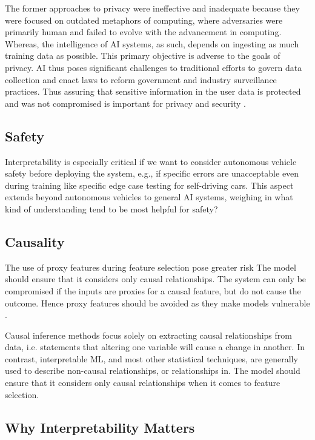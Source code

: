 The former approaches to privacy were ineffective and inadequate because they were focused on outdated metaphors of computing, where adversaries were primarily human and failed to evolve with the advancement in computing. Whereas, the intelligence of AI systems, as such, depends on ingesting as much training data as possible. This primary objective is adverse to the goals of privacy. AI thus poses significant challenges to traditional efforts to govern data collection and enact laws to reform government and industry surveillance practices. Thus assuring that sensitive information in the user data is protected and was not compromised is important for privacy and security \cite{molnar}. 

\subsection{Safety}

Interpretability is especially critical if we want to consider autonomous vehicle safety before deploying the system, e.g., if specific errors are unacceptable even during training like specific edge case testing for self-driving cars. This aspect extends beyond autonomous vehicles to general AI systems, weighing in what kind of understanding tend to be most helpful for safety?

\subsection*{Causality}

The use of proxy features during feature selection pose greater risk 
The model should ensure that it considers only causal relationships.  The system can only be compromised if the inputs are proxies for a causal feature, but do not cause the outcome. Hence proxy features should be avoided as they make models vulnerable \cite{molnar}.

Causal inference methods focus solely on extracting causal relationships from data, i.e. statements that altering one variable will cause a change in another. In contrast, interpretable ML, and most other statistical techniques, are generally used to describe non-causal relationships, or relationships in. The model should ensure that it considers only causal relationships when it comes to feature selection.

\subsection{Why Interpretability Matters}

